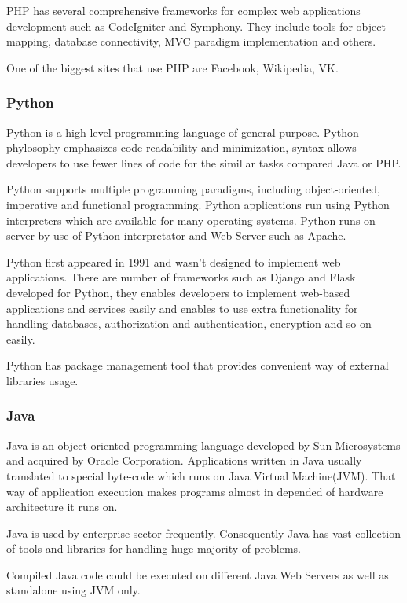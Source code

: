 \documentclass[thesis=M,english]{FITthesis}[2012/10/20]
\begin{document}
PHP has several comprehensive frameworks for complex web applications development such as CodeIgniter and Symphony. They include tools for object mapping, database connectivity, MVC paradigm implementation and others.

One of the biggest sites that use PHP are Facebook, Wikipedia, VK.

\subsubsection{Python}

Python is a high-level programming language of general purpose. Python phylosophy emphasizes code readability and minimization, syntax allows developers to use fewer lines of code for the simillar tasks compared Java or PHP. 

Python supports multiple programming paradigms, including object-oriented, imperative and functional programming. Python applications run using Python interpreters which are available for many operating systems. Python runs on server by use of Python interpretator and Web Server such as Apache.

Python first appeared in 1991 and wasn't designed to implement web applications. There are number of frameworks such as Django and Flask developed for Python, they enables developers to implement web-based applications and services easily and enables to use extra functionality for handling databases, authorization and authentication, encryption and so on easily.

Python has package management tool that provides convenient way of external libraries usage.
 

\subsubsection{Java}

Java is an object-oriented programming language developed by Sun Microsystems and acquired by Oracle Corporation. Applications written in Java usually translated to special byte-code which runs on Java Virtual Machine(JVM). That way of application execution makes programs almost in depended of hardware architecture it runs on.

Java is used by enterprise sector frequently. Consequently Java has vast collection of tools and libraries for handling huge majority of problems.

Compiled Java code could be executed on different Java Web Servers as well as standalone using JVM only.
\end{document}
